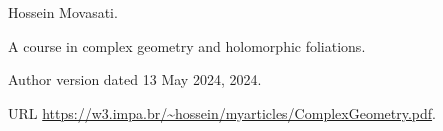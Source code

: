 Hossein Movasati.

\newblock A course in complex geometry and holomorphic foliations.

\newblock Author version dated 13 May 2024, 2024.

\newblock URL \url{https://w3.impa.br/~hossein/myarticles/ComplexGeometry.pdf}.

